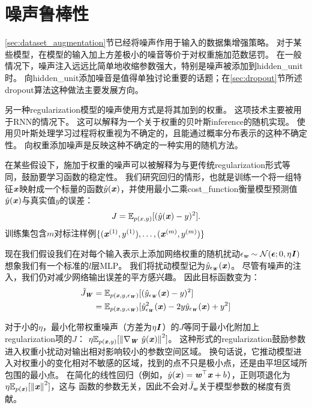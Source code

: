 
\section{噪声鲁棒性}
\label{sec:noise_robustness}

\ref{sec:dataset_augmentation}节已经将噪声作用于输入的数据集增强策略。
对于某些模型，在模型的输入加上方差极小的噪音等价于对权重施加范数惩罚\citep{Bishop1995,bishop95training}。
在一般情况下，噪声注入远远比简单地收缩参数强大，特别是噪声被添加到\gls{hidden_unit}时。
向\gls{hidden_unit}添加噪音是值得单独讨论重要的话题；在\ref{sec:dropout}节所述\gls{dropout}算法这种做法主要发展方向。

另一种\gls{regularization}模型的噪声使用方式是将其加到的权重。
这项技术主要被用于\gls{RNN}的情况下\citep{JimGilesHorne1996,Graves-2011}。
这可以解释为一个关于权重的贝叶斯\gls{inference}的随机实现。
使用贝叶斯处理学习过程将权重视为不确定的，且能通过概率分布表示的这种不确定性。
向权重添加噪声是反映这种不确定的一种实用的随机方法。

在某些假设下，施加于权重的噪声可以被解释为与更传统\gls{regularization}形式等同，鼓励要学习函数的稳定性。
我们研究回归的情形，也就是训练一个将一组特征$\boldsymbol{\mathit{x}}$映射成一个标量的函数$\hat y(\boldsymbol{\mathit{x}})$，并使用最小二乘\gls{cost_function}衡量模型预测值$\hat y(\boldsymbol{\mathit{x}})$与真实值$y$的误差：
\begin{align}
 J = \mathbb{E}_{p(x,y)}[(\hat y(\boldsymbol{\mathit{x}}) - y)^2].
\end{align}
训练集包含$m$对标注样例$\{(\boldsymbol{\mathit{x}}^{(1)}, y^{(1)}),\dots,(\boldsymbol{\mathit{x}}^{(m)}, y^{(m)})\}$

现在我们假设我们在对每个输入表示上添加网络权重的随机扰动$\epsilon_{\boldsymbol{\mathit{w}}} \sim \mathcal{N}(\boldsymbol{\epsilon};0, \eta\boldsymbol{\mathit{I}} )$
想象我们有一个标准的$l$层MLP。
我们将扰动模型记为$\hat y_{\epsilon_{\boldsymbol{\mathit{W}}}} (\boldsymbol{\mathit{x}})$。
尽管有噪声的注入，我们仍对减少网络输出误差的平方感兴趣。
因此目标函数变为：
\begin{align}
 \tilde J_{\boldsymbol{\mathit{W}}} &= \mathbb{E}_{p(\boldsymbol{\mathit{x}},y,\epsilon_{\boldsymbol{\mathit{W}}})}[(\hat y_{\epsilon_{\boldsymbol{\mathit{W}}}}(\boldsymbol{\mathit{x}}) - y)^2] \\
   &=  \mathbb{E}_{p(\boldsymbol{\mathit{x}},y,\epsilon_{\boldsymbol{\mathit{W}}})}[\hat y_{\epsilon_{\boldsymbol{\mathit{W}}}}^2(\boldsymbol{\mathit{x}}) -  2y\hat y_{\epsilon_{\boldsymbol{\mathit{W}}}}
   (\boldsymbol{\mathit{x}})+ y^2] 
\end{align}

对于小的$\eta$，最小化带权重噪声（方差为$\eta \boldsymbol{\mathit{I}}$）的$J$等同于最小化附加上\gls{regularization}项的$J$：
$ \eta \mathbb{E}_{p(\boldsymbol{\mathit{x}},y)}[\left\lVert\nabla_{\boldsymbol{\mathit{W}}}~\hat y(\boldsymbol{\mathit{x}})\right\rVert^2]$。
这种形式的\gls{regularization}鼓励参数进入权重小扰动对输出相对影响较小的参数空间区域。
换句话说，它推动模型进入对权重小的变化相对不敏感的区域，找到的点不只是极小点，还是由平坦区域所包围的最小点\citep{Hochreiter95}。
在简化的线性回归（例如，$\hat y(\boldsymbol{\mathit{x}}) = \boldsymbol{\mathit{w}}^\top \boldsymbol{\mathit{x}} + b$），正则项退化为$ \eta \mathbb{E}_{p(\boldsymbol{\mathit{x}})}[\left\lVert\boldsymbol{\mathit{x}}\right\rVert^2]$，这与
函数的参数无关，因此不会对$\tilde J_{\boldsymbol{\mathit{w}}}$关于模型参数的梯度有贡献。

